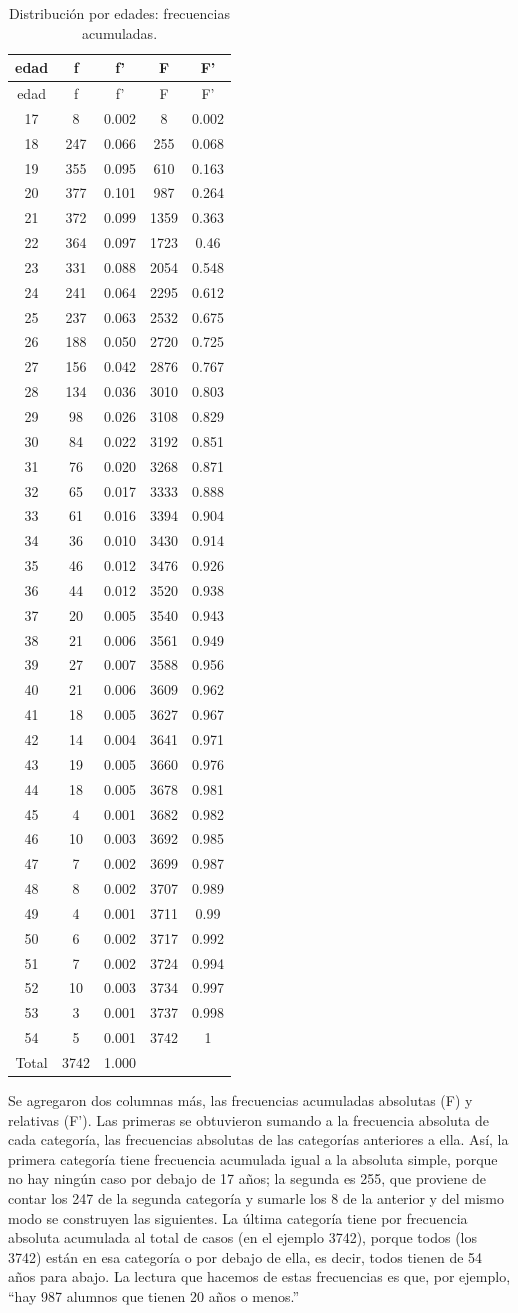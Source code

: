 \documentclass[]{book}
\begin{document}
\begin{longtable}[]{@{}ccccc@{}}
\caption{\label{tab:unnamed-chunk-27}Distribución por edades: frecuencias acumuladas.}\tabularnewline
\toprule
edad & f & f' & F & F'\tabularnewline
\midrule
\endfirsthead
\toprule
edad & f & f' & F & F'\tabularnewline
\midrule
\endhead
17 & 8 & 0.002 & 8 & 0.002\tabularnewline
18 & 247 & 0.066 & 255 & 0.068\tabularnewline
19 & 355 & 0.095 & 610 & 0.163\tabularnewline
20 & 377 & 0.101 & 987 & 0.264\tabularnewline
21 & 372 & 0.099 & 1359 & 0.363\tabularnewline
22 & 364 & 0.097 & 1723 & 0.46\tabularnewline
23 & 331 & 0.088 & 2054 & 0.548\tabularnewline
24 & 241 & 0.064 & 2295 & 0.612\tabularnewline
25 & 237 & 0.063 & 2532 & 0.675\tabularnewline
26 & 188 & 0.050 & 2720 & 0.725\tabularnewline
27 & 156 & 0.042 & 2876 & 0.767\tabularnewline
28 & 134 & 0.036 & 3010 & 0.803\tabularnewline
29 & 98 & 0.026 & 3108 & 0.829\tabularnewline
30 & 84 & 0.022 & 3192 & 0.851\tabularnewline
31 & 76 & 0.020 & 3268 & 0.871\tabularnewline
32 & 65 & 0.017 & 3333 & 0.888\tabularnewline
33 & 61 & 0.016 & 3394 & 0.904\tabularnewline
34 & 36 & 0.010 & 3430 & 0.914\tabularnewline
35 & 46 & 0.012 & 3476 & 0.926\tabularnewline
36 & 44 & 0.012 & 3520 & 0.938\tabularnewline
37 & 20 & 0.005 & 3540 & 0.943\tabularnewline
38 & 21 & 0.006 & 3561 & 0.949\tabularnewline
39 & 27 & 0.007 & 3588 & 0.956\tabularnewline
40 & 21 & 0.006 & 3609 & 0.962\tabularnewline
41 & 18 & 0.005 & 3627 & 0.967\tabularnewline
42 & 14 & 0.004 & 3641 & 0.971\tabularnewline
43 & 19 & 0.005 & 3660 & 0.976\tabularnewline
44 & 18 & 0.005 & 3678 & 0.981\tabularnewline
45 & 4 & 0.001 & 3682 & 0.982\tabularnewline
46 & 10 & 0.003 & 3692 & 0.985\tabularnewline
47 & 7 & 0.002 & 3699 & 0.987\tabularnewline
48 & 8 & 0.002 & 3707 & 0.989\tabularnewline
49 & 4 & 0.001 & 3711 & 0.99\tabularnewline
50 & 6 & 0.002 & 3717 & 0.992\tabularnewline
51 & 7 & 0.002 & 3724 & 0.994\tabularnewline
52 & 10 & 0.003 & 3734 & 0.997\tabularnewline
53 & 3 & 0.001 & 3737 & 0.998\tabularnewline
54 & 5 & 0.001 & 3742 & 1\tabularnewline
Total & 3742 & 1.000 & &\tabularnewline
\bottomrule
\end{longtable}

Se agregaron dos columnas más, las frecuencias acumuladas absolutas (F) y relativas (F'). Las primeras se obtuvieron sumando a la frecuencia absoluta de cada categoría, las frecuencias absolutas de las categorías anteriores a ella. Así, la primera categoría tiene frecuencia acumulada igual a la absoluta simple, porque no hay ningún caso por debajo de 17 años; la segunda es 255, que proviene de contar los 247 de la segunda categoría y sumarle los 8 de la anterior y del mismo modo se construyen las siguientes. La última categoría tiene por frecuencia absoluta acumulada al total de casos (en el ejemplo 3742), porque todos (los 3742) están en esa categoría o por debajo de ella, es decir, todos tienen de 54 años para abajo. La lectura que hacemos de estas frecuencias es que, por ejemplo, ``hay 987 alumnos que tienen 20 años o menos.''
\end{document}
